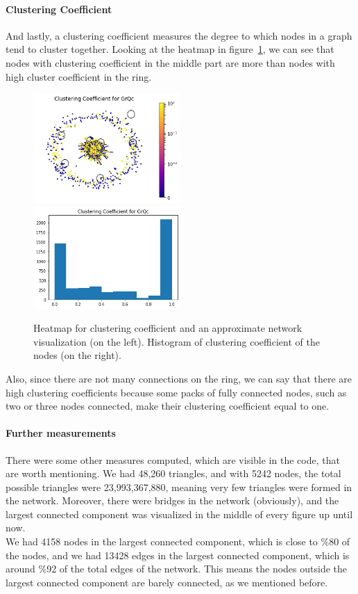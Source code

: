 \documentclass[letterpaper, 11pt]{article}
\newcommand{\1}{\mathds{1}}	%
\theoremstyle{definition}
\begin{document}
\paragraph{Clustering Coefficient} And lastly, a clustering coefficient measures the degree to which nodes in a graph tend to cluster together. Looking at the heatmap in figure~\ref{fig:clustering}, we can see that nodes with clustering coefficient in the middle part are more than nodes with high cluster coefficient in the ring.
\begin{figure}[h]
\includegraphics[width=0.5\textwidth]{GrQc_clustering.png}
\includegraphics[width=0.5\textwidth]{GrQc_clustering_hist.png}
\captionsetup{justification=centering,margin=0.5cm}
\caption{Heatmap for clustering coefficient and an approximate network visualization (on the left). Histogram of clustering coefficient of the nodes (on the right).}
\label{fig:clustering}
\end{figure}
Also, since there are not many connections on the ring, we can say that there are high clustering coefficients because some packs of fully connected nodes, such as two or three nodes connected, make their clustering coefficient equal to one. 
\paragraph{Further measurements}There were some other measures computed, which are visible in the code, that are worth mentioning. We had 48,260 triangles, and with 5242 nodes, the total possible triangles were 23,993,367,880, meaning very few triangles were formed in the network. Moreover, there were bridges in the network (obviously), and the largest connected component was visualized in the middle of every figure up until now. \\
We had 4158 nodes in the largest connected component, which is close to \%80 of the nodes, and we had 13428 edges in the largest connected component, which is around \%92 of the total edges of the network. This means the nodes outside the largest connected component are barely connected, as we mentioned before.
\end{document}
